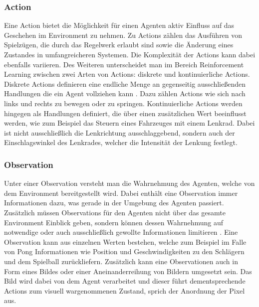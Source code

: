 \documentclass[11pt]{scrartcl}
\begin{document}
\subsubsection{Action}
\label{sec:action}
Eine Action bietet die Möglichkeit für einen Agenten aktiv Einfluss auf das Geschehen im
Environment zu nehmen. Zu Actions zählen das Ausführen von Spielzügen, die durch das
Regelwerk erlaubt sind sowie die Änderung eines Zustandes in umfangreicheren Systemen. Die
Komplexität der Actions kann dabei ebenfalls variieren. Des Weiteren unterscheidet man im Bereich
Reinforcement Learning zwischen zwei Arten von Actions: diskrete und kontinuierliche Actions.
Diskrete Actions definieren eine endliche Menge an gegenseitig ausschließenden Handlungen die ein
Agent vollziehen kann \cite[~S.8]{L2018}. Dazu zählen Actions wie sich nach links und rechts zu
bewegen oder zu springen. Kontinuierliche Actions werden hingegen als Handlungen definiert, die
über einen zusätzlichen Wert beeinflusst werden, wie zum Beispiel das Steuern eines Fahrzeuges
mit einem Lenkrad. Dabei ist nicht ausschließlich die Lenkrichtung ausschlaggebend, sondern auch
der Einschlagswinkel des Lenkrades, welcher die Intensität der Lenkung festlegt.


\subsubsection{Observation}
Unter einer Observation versteht man die Wahrnehmung des Agenten, welche von dem Environment 
bereitgestellt wird. Dabei enthält eine Observation immer Informationen dazu, was gerade in der
Umgebung des Agenten passiert. Zusätzlich müssen Observations für den Agenten nicht über das
gesamte Environment Einblick geben, sondern können dessen Wahrnehmung auf notwendige oder auch
ausschließlich gewollte Informationen limitieren \cite[~S.8 f.]{L2018}. Eine Observation kann 
aus einzelnen Werten bestehen, welche zum Beispiel im Falle von Pong Informationen wie Position
und Geschwindigkeiten zu den Schlägern und dem Spielball zurückliefern. Zusätzlich kann eine
Observationen auch in Form eines Bildes oder einer Aneinanderreihung von Bildern umgesetzt sein.
Das Bild wird dabei von dem Agent verarbeitet und dieser führt dementsprechende Actions zum
visuell wargenommenen Zustand, sprich der Anordnung der Pixel aus. 
\end{document}
